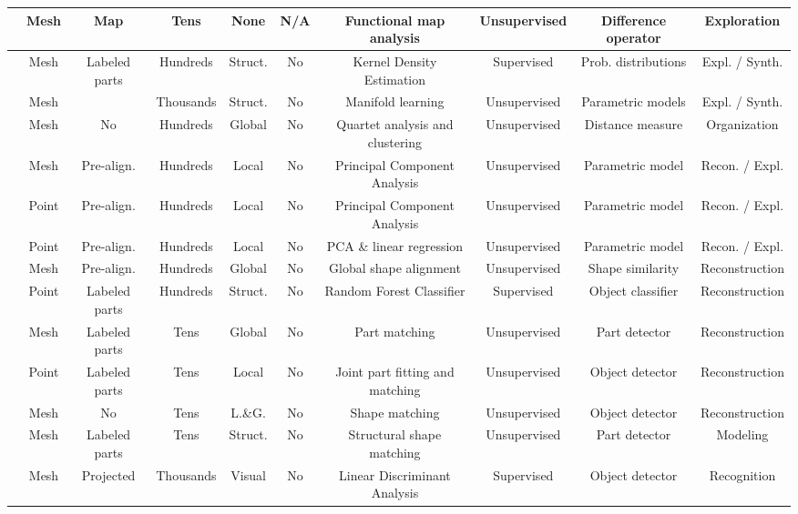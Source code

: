 \begin{table*}[t!]
\begin{tabular*}{\textwidth}{l|c|c|c|c|c|c|c|c|c}
    \cite{Rustamov:2013:SD}	&Mesh	&Map	&Tens	&None	&N/A	&Functional map analysis	&Unsupervised	&Difference operator	&Exploration \\ \hline
    \cite{Fish:2014:MR}	&Mesh	&Labeled parts	&Hundreds	&Struct.	&No	&Kernel Density Estimation	&Supervised	&Prob. distributions	&Expl. / Synth. \\ \hline
    \cite{Averkiou:2014:spm}	&Mesh	&\cite{Kim:2013:lpt}	&Thousands	&Struct.	&No	&Manifold learning	&Unsupervised	&Parametric models	&Expl. / Synth. \\ \hline
    \cite{Huang:2013:QOC}	&Mesh	&No	&Hundreds	&Global	&No	&Quartet analysis and clustering	&Unsupervised	&Distance measure	&Organization \\ \hline
    \cite{Blanz:1999:MMS}	&Mesh	&Pre-align.	&Hundreds	&Local	&No	&Principal Component Analysis	&Unsupervised	&Parametric model	&Recon. / Expl. \\ \hline
    \cite{Allen:2003:SHB}	&Point	&Pre-align.	&Hundreds	&Local	&No	&Principal Component Analysis	&Unsupervised	&Parametric model	&Recon. / Expl. \\ \hline
    \cite{Hasler:2009:SSR}	&Point	&Pre-align.	&Hundreds	&Local	&No	&PCA \& linear regression	&Unsupervised	&Parametric model	&Recon. / Expl. \\ \hline
    \cite{Pauly:2005:ESC}	&Mesh	&Pre-align.	&Hundreds	&Global	&No	&Global shape alignment	&Unsupervised	&Shape similarity	&Reconstruction \\ \hline
    \cite{Nan:2012:SAC}	&Point	&Labeled parts	&Hundreds	&Struct.	&No	&Random Forest Classifier	&Supervised	&Object classifier	&Reconstruction \\ \hline
    \cite{Shen:2012:SRP}	&Mesh	&Labeled parts	&Tens	&Global	&No	&Part matching	&Unsupervised	&Part detector	&Reconstruction \\ \hline
    \cite{Kim:2012:AIE}	&Point	&Labeled parts	&Tens	&Local	&No	&Joint part fitting and matching	&Unsupervised	&Object detector	&Reconstruction \\ \hline
    \cite{Salas-Moreno:2013:SLAM}	&Mesh	&No	&Tens	&L.\&G.	&No	&Shape matching	&Unsupervised	&Object detector	&Reconstruction \\ \hline
    \cite{Xu:2011:PMO}	&Mesh	&Labeled parts	&Tens	&Struct.	&No	&Structural shape matching	&Unsupervised	&Part detector	&Modeling \\ \hline
    \cite{Aubry14}	&Mesh	&Projected	&Thousands	&Visual	&No	&Linear Discriminant Analysis	&Supervised	&Object detector	&Recognition \\ \hline

\end{tabular*}
\end{table*}
